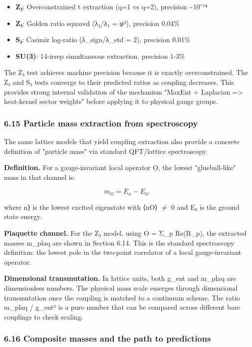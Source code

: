 \begin{itemize}
\tightlist
\item
  \textbf{Z₃}: Overconstrained t extraction (q=1 vs q=2), precision \textasciitilde10⁻¹⁴
\item
  \textbf{Z₅}: Golden ratio squared (λ₂/λ₁ = φ²), precision 0.04\%
\item
  \textbf{S₃}: Casimir log-ratio (λ\_sign/λ\_std = 2), precision 0.01\%
\item
  \textbf{SU(3)}: 14-irrep simultaneous extraction, precision 1-3\%
\end{itemize}

The Z₃ test achieves machine precision because it is exactly overconstrained. The Z₅ and S₃ tests converge to their predicted ratios as coupling decreases. This provides strong internal validation of the mechanism "MaxEnt + Laplacian =\textgreater{} heat-kernel sector weights" before applying it to physical gauge groups.

\subsubsection{6.15 Particle mass extraction from spectroscopy}\label{615-particle-mass-extraction-from-spectroscopy}

The same lattice models that yield coupling extraction also provide a concrete definition of "particle mass" via standard QFT/lattice spectroscopy.

\textbf{Definition.} For a gauge-invariant local operator O, the lowest "glueball-like" mass in that channel is:

\[
m_O = E_n - E_0,
\]

where \textbar n⟩ is the lowest excited eigenstate with ⟨n\textbar O⟩ \(\neq\) 0 and E₀ is the ground state energy.

\textbf{Plaquette channel.} For the Z₃ model, using O = Σ\_p Re(B\_p), the extracted masses m\_plaq are shown in Section 6.14. This is the standard spectroscopy definition: the lowest pole in the two-point correlator of a local gauge-invariant operator.

\textbf{Dimensional transmutation.} In lattice units, both g\_ent and m\_plaq are dimensionless numbers. The physical mass scale emerges through dimensional transmutation once the coupling is matched to a continuum scheme. The ratio m\_plaq / g\_ent² is a pure number that can be compared across different bare couplings to check scaling.

\subsubsection{6.16 Composite masses and the path to predictions}\label{616-composite-masses-and-the-path-to-predictions}

